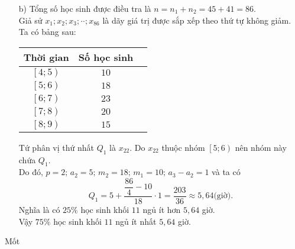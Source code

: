 \begin{bt}
{\begin{enumerate}
			      $$\overline{x_1}=\dfrac{4{,}5\cdot 6+5{,}5\cdot10+6{,}5\cdot13+7{,}5\cdot9+8{,}5\cdot7}{45}=\dfrac{587}{90}\approx 6{,}52\,\, \text{(giờ)}.$$
			      Tổng số học sinh nữ là $n_2=4+8+10+11+8=41$. Thời gian ngủ trung bình của học sinh nữ là:
			      $$\overline{x_2}=\dfrac{4,5\cdot4+5,5\cdot8+6,5\cdot10+7,5\cdot11+8,5\cdot8}{41}=\dfrac{555}{82}\approx 6{,}77 \,\,\text{(giờ)}.$$
			      Vì $\overline{x_2}>\overline{x_1}$ nên thời gian ngủ trung bình của các bạn học sinh nữ lớn hơn thời gian ngủ trung bình của các bạn nam.
			\item [b)] Tổng số học sinh được điều tra là $n=n_1+n_2=45+41=86$.\\
			      Giả sử $x_1;x_2;x_3;\cdot \cdot;x_{86}$ là dãy giá trị được sắp xếp theo thứ tự không giảm.\\
			      Ta có bảng sau:
			      \begin{center}
				      \begin{tabular}{|c|c|c|}
					      \hline
					      Thời gian           & Số học sinh \\
					      \hline
					      $\left[4;5 \right)$ & $10$        \\
					      \hline
					      $\left[5;6 \right)$ & $18$        \\
					      \hline
					      $\left[6;7 \right)$ & $23$        \\
					      \hline
					      $\left[7;8 \right)$ & $20$        \\
					      \hline
					      $\left[8;9 \right)$ & $15$        \\
					      \hline
				      \end{tabular}
			      \end{center}
			      Tứ phân vị thứ nhất $Q_1$ là $x_{22}$. Do $x_{22}$ thuộc nhóm $\left[5;6\right)$ nên nhóm này chứa $Q_1$.\\ Do đó, $p=2;\,a_2=5;\,m_2=18;\,m_1=10;\,a_3-a_2=1$ và ta có
			      $$Q_1=5+\dfrac{\dfrac{86}{4}-10}{18}\cdot 1=\dfrac{203}{36}\approx 5{,}64 \text{(giờ)}.$$
			      Nghĩa là có $25\%$ học sinh khối $11$ ngủ ít hơn $5{,}64$ giờ.\\ Vậy $75\%$ học sinh khối $11$ ngủ ít nhất $5{,}64$ giờ.
		\end{enumerate}
	}
\end{bt}
\setcounter{subsubsection}{0}
\setcounter{ex}{0}
\setcounter{bt}{0}
\begin{dang}{Mốt}

\end{dang}
